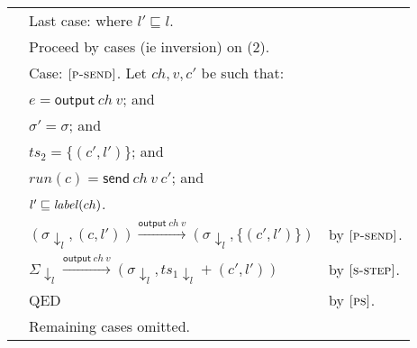 \documentclass{article}
\newcommand{\rn}[1]{\text{\textsc{[#1]}}}
\newcommand{\tsteparrow}[1]{\overset{#1}{\longrightarrow}}
\newcommand{\tstep}[3]{#2\tsteparrow{#1}#3}
\newcommand{\ssteparrow}[1]{\overset{#1}{\longrightarrow}}
\newcommand{\sstep}[3]{#2\ssteparrow{#1}#3}
\newcommand{\s}[1]{\text{\textit{#1}}}
\newcommand{\thread}[2]{(#1,#2)}
\newcommand{\opsend}[3]{\textsf{send}~#1~#2~#3}
\newcommand{\evsend}[2]{\textsf{output}~#1~#2}
\newcommand{\proj}[2]{#1{\downarrow_{#2}}}
\begin{document}
\begin{tabular}{l@{$\qquad$}l@{$\qquad$}l}
        & Last case: where $l'\sqsubseteq l$.
\\
        & Proceed by cases (ie inversion) on (2).
\\
        & Case: $\rn{p-send}$. Let $ch,v,c'$ be such that:
\\
        & \z $e=\evsend{ch}{v}$; and
\\
        & \z $\sigma'=\sigma$; and
\\
        & \z $ts_2=\{\thread{c'}{l'}\}$; and
\\
        & \z $run(c)=\opsend{ch}{v}{c'}$; and
\\
        & \z $l'\sqsubseteq\s{label}(ch)$.
\\
        & \z $\tstep{\evsend{ch}{v}}{(\proj{\sigma}{l},\thread{c}{l'})}{(\proj{\sigma}{l},\{\thread{c'}{l'}\})}$
        & by $\rn{p-send}$.
\\
        & \z $\sstep{\evsend{ch}{v}}{\proj{\Sigma}{l}}{(\proj{\sigma}{l},\proj{ts_1}{l}+\thread{c'}{l'})}$
        & by $\rn{s-step}$.
\\
        & \z QED
        & by $\rn{ps}$.
\\
        & Remaining cases omitted.
\end{tabular}
\end{document}
